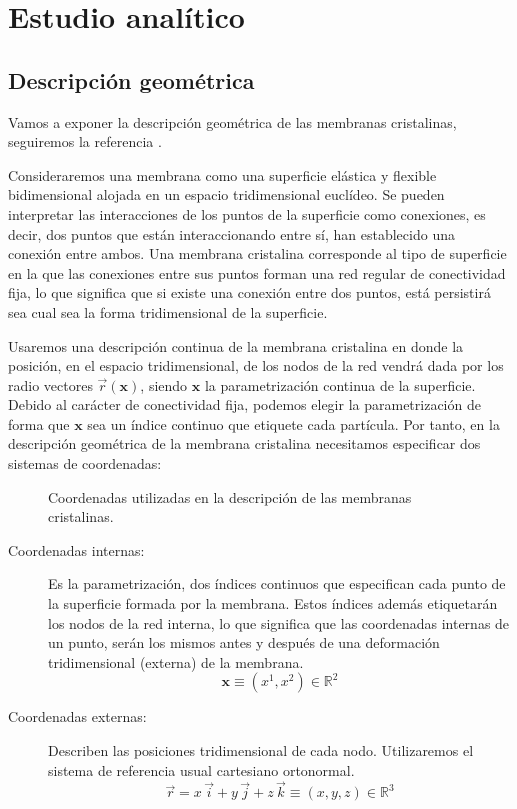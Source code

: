 \chapter{Estudio analítico}

\section{Descripción geométrica}

Vamos a exponer la descripción geométrica de las membranas cristalinas,
seguiremos la referencia \cite{David:geometria}.

Consideraremos una membrana como una superficie elástica y flexible 
bidimensional alojada en un espacio tridimensional euclídeo. 
Se pueden interpretar las interacciones de los puntos de la superficie como
conexiones, es decir, dos puntos que están interaccionando entre sí, han
establecido una conexión entre ambos. Una membrana cristalina corresponde al
tipo de superficie en la que las conexiones entre sus puntos forman una red
regular de conectividad fija, lo que significa que si existe una conexión
entre dos puntos, está persistirá sea cual sea la forma tridimensional de la
superficie.

Usaremos una descripción continua de la membrana cristalina en donde la
posición, en el espacio tridimensional, de los nodos de la red vendrá dada por los
radio vectores $\vec{r}(\mathbf{x})$, siendo $\mathbf{x}$ la parametrización
continua de la superficie. Debido al carácter de conectividad fija, podemos
elegir la parametrización de forma que $\mathbf{x}$ sea un índice continuo
que etiquete cada partícula. Por tanto, en la descripción geométrica de la
membrana cristalina necesitamos especificar dos sistemas de coordenadas:

\begin{figure}[h]
\centering
{}
\quad
{}
\caption{Coordenadas utilizadas en la descripción de las membranas cristalinas.}
\end{figure}

\begin{description}
\item[Coordenadas internas:] Es la parametrización, dos índices continuos que
  especifican cada punto de la superficie formada por la membrana. Estos
  índices además etiquetarán los nodos de la red interna, lo que significa que las
  coordenadas internas de un punto, serán los mismos antes y después de una
  deformación tridimensional (externa) de la membrana. 
  \begin{equation*}
  \mathbf{x}\equiv (x^1,x^2)\in \mathbb{R}^2
  \end{equation*}
\item[Coordenadas externas:] Describen las posiciones tridimensional de cada
  nodo. Utilizaremos el sistema de referencia usual cartesiano ortonormal.
  \begin{equation*}
    \vec{r}=x\,\vec{i}+y\,\vec{j}+z\,\vec{k}\equiv (x,y,z)\in \mathbb{R}^3
  \end{equation*}
\end{description}

